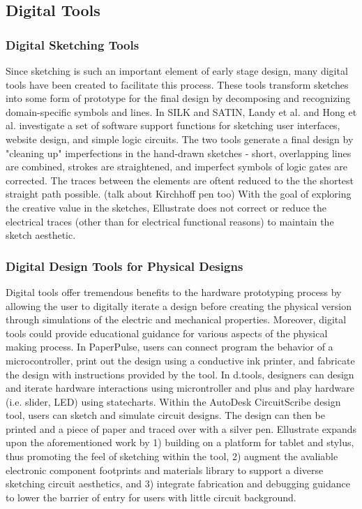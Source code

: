 \documentclass{sigchi}
\begin{document}
\subsection{Digital Tools}

\subsubsection{Digital Sketching Tools} 
Since sketching is such an important element of early stage design, many digital tools have been created to facilitate this process. These tools transform sketches into some form of prototype for the final design by decomposing and recognizing domain-specific symbols and lines. In SILK and SATIN, Landy et al. and Hong et al. investigate a set of software support functions for sketching user interfaces, website design, and simple logic circuits. The two tools generate a final design by "cleaning up" imperfections in the hand-drawn sketches - short, overlapping lines are combined, strokes are straightened, and imperfect symbols of logic gates are corrected. The traces between the elements are oftent reduced to the the shortest straight path possible. (talk about Kirchhoff pen too) With the goal of exploring the creative value in the sketches, Ellustrate does not correct or reduce the electrical traces (other than for electrical functional reasons) to maintain the sketch aesthetic. 

\subsubsection{Digital Design Tools for Physical Designs}
Digital tools offer tremendous benefits to the hardware prototyping process by allowing the user to digitally iterate a design before creating the physical version through simulations of the electric and mechanical properties. Moreover, digital tools could provide educational guidance for various aspects of the physical making process.  In PaperPulse, users can connect program the behavior of a microcontroller, print out the design using a conductive ink printer, and fabricate the design with instructions provided by the tool. In d.tools, designers can design and iterate hardware interactions using microntroller and plus and play hardware (i.e. slider, LED) using statecharts. Within the AutoDesk CircuitScribe design tool, users can sketch and simulate circuit designs. The design can then be printed and a piece of paper and traced over with a silver pen. Ellustrate expands upon the aforementioned work by 1) building on a platform for tablet and stylus, thus promoting the feel of sketching within the tool, 2) augment the avaliable electronic component footprints and materials library to support a diverse sketching circuit aesthetics, and 3) integrate fabrication and debugging guidance to lower the barrier of entry for users with little circuit background.
\end{document}
